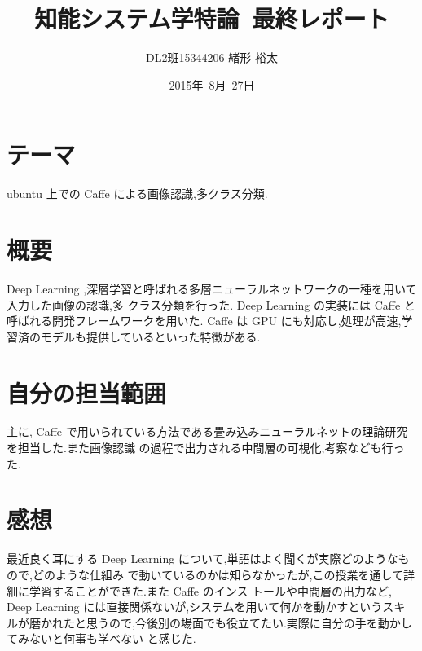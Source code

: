 \documentclass[a4paper,10pt]{jsarticle}
\title{知能システム学特論\ 最終レポート}
\author{
DL2班\hspace{5mm}15344206 \hspace{5mm}緒形 裕太\\
}
\date{2015年\ 8月\ 27日}
\begin{document}
\maketitle

\section{テーマ}
\label{sec:テーマ}
ubuntu 上での Caffe による画像認識,多クラス分類.

\section{概要}
\label{sec:概要}
Deep Learning ,深層学習と呼ばれる多層ニューラルネットワークの一種を用いて入力した画像の認識,多
クラス分類を行った. Deep Learning の実装には Caffe と呼ばれる開発フレームワークを用いた. Caffe は
GPU にも対応し,処理が高速,学習済のモデルも提供しているといった特徴がある.

\section{自分の担当範囲}
\label{sec:自分の担当範囲}
主に, Caffe で用いられている方法である畳み込みニューラルネットの理論研究を担当した.また画像認識
の過程で出力される中間層の可視化,考察なども行った.

\section{感想}
\label{sec:感想}
最近良く耳にする Deep Learning について,単語はよく聞くが実際どのようなもので,どのような仕組み
で動いているのかは知らなかったが,この授業を通して詳細に学習することができた.また Caffe のインス
トールや中間層の出力など, Deep Learning には直接関係ないが,システムを用いて何かを動かすというスキ
ルが磨かれたと思うので,今後別の場面でも役立てたい.実際に自分の手を動かしてみないと何事も学べない
と感じた.
\end{document}
